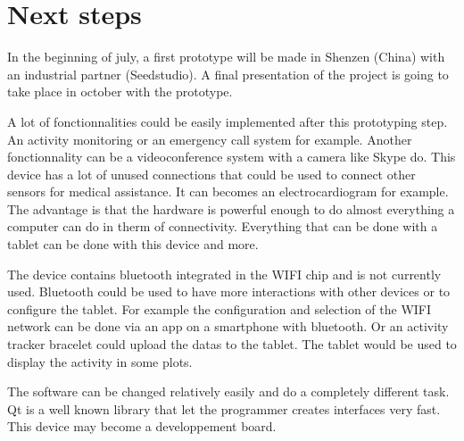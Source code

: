 \section{Next steps}

In the beginning of july, a first prototype will be made in Shenzen (China) with an industrial partner (Seedstudio). A final presentation of the project is going to take place in october with the prototype.

A lot of fonctionnalities could be easily implemented after this prototyping step. An activity monitoring or an emergency call system for example. Another fonctionnality can be a videoconference system with a camera like Skype do. This device has a lot of unused connections that could be used to connect other sensors for medical assistance. It can becomes an electrocardiogram for example. The advantage is that the hardware is powerful enough to do almost everything a computer can do in therm of connectivity. Everything that can be done with a tablet can be done with this device and more.

The device contains bluetooth integrated in the WIFI chip and is not currently used. Bluetooth could be used to have more interactions with other devices or to configure the tablet. For example the configuration and selection of the WIFI network can be done via an app on a smartphone with bluetooth. Or an activity tracker bracelet could upload the datas to the tablet. The tablet would be used to display the activity in some plots.

The software can be changed relatively easily and do a completely different task. Qt is a well known library that let the programmer creates interfaces very fast. This device may become a developpement board.

